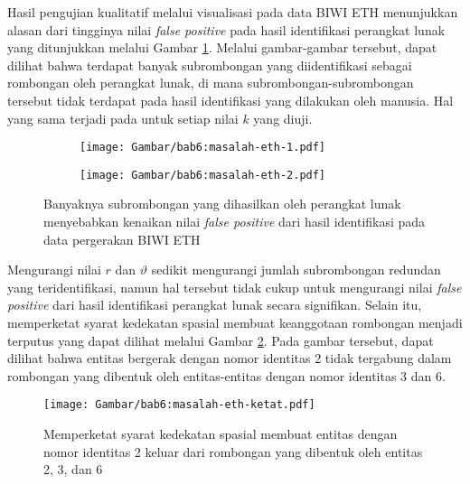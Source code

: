 Hasil pengujian kualitatif melalui visualisasi pada data BIWI ETH menunjukkan alasan dari tingginya nilai \textit{false positive} pada hasil identifikasi perangkat lunak yang ditunjukkan melalui Gambar \ref{bab6:masalah-eth}. Melalui gambar-gambar tersebut, dapat dilihat bahwa terdapat banyak subrombongan yang diidentifikasi sebagai rombongan oleh perangkat lunak, di mana subrombongan-subrombongan tersebut tidak terdapat pada hasil identifikasi yang dilakukan oleh manusia. Hal yang sama terjadi pada untuk setiap nilai $k$ yang diuji.

\begin{figure}[h]
    \centering
    \captionsetup{width=.65\textwidth}
    \begin{subfigure}[t]{0.275\textwidth}
        \centering
        \texttt{[image: Gambar/bab6:masalah-eth-1.pdf]}
    \end{subfigure}
    \begin{subfigure}[t]{0.275\textwidth}
        \centering
        \texttt{[image: Gambar/bab6:masalah-eth-2.pdf]}
    \end{subfigure}
    \caption[Subrombongan pada data BIWI ETH]{Banyaknya subrombongan yang dihasilkan oleh perangkat lunak menyebabkan kenaikan nilai \textit{false positive} dari hasil identifikasi pada data pergerakan BIWI ETH}
    \label{bab6:masalah-eth}
\end{figure}

Mengurangi nilai $r$ dan $\vartheta$ sedikit mengurangi jumlah subrombongan redundan yang teridentifikasi, namun hal tersebut tidak cukup untuk mengurangi nilai \textit{false positive} dari hasil identifikasi perangkat lunak secara signifikan. Selain itu, memperketat syarat kedekatan spasial membuat keanggotaan rombongan menjadi terputus yang dapat dilihat melalui Gambar \ref{bab6:masalah-syarat-ketat-eth}. Pada gambar tersebut, dapat dilihat bahwa entitas bergerak dengan nomor identitas 2 tidak tergabung dalam rombongan yang dibentuk oleh entitas-entitas dengan nomor identitas 3 dan 6.

\begin{figure}[h]
    \centering
    \captionsetup{width=0.6\textwidth}
    \texttt{[image: Gambar/bab6:masalah-eth-ketat.pdf]}
    \caption[Dampak ketatnya syarat kedekatan spasial pada data ETH]{Memperketat syarat kedekatan spasial membuat entitas dengan nomor identitas 2 keluar dari rombongan yang dibentuk oleh entitas 2, 3, dan 6}
    \label{bab6:masalah-syarat-ketat-eth}
\end{figure}

